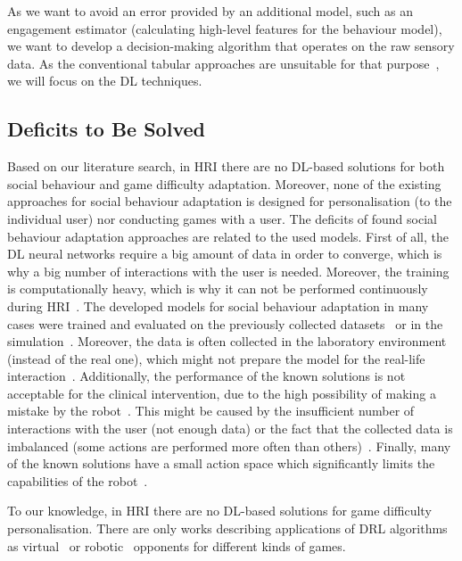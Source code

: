 \documentclass[thesis]{mas_proposal}
\begin{document}
As we want to avoid an error provided by an additional model, such as an engagement estimator (calculating high-level features for the behaviour model), we want to develop a decision-making algorithm that operates on the raw sensory data. As the conventional tabular approaches are unsuitable for that purpose~\cite{akalin2021reinforcement}, we will focus on the DL techniques.

\subsection{Deficits to Be Solved}
Based on our literature search, in HRI there are no DL-based solutions for both social behaviour and game difficulty adaptation. Moreover, none of the existing approaches for social behaviour adaptation is designed for personalisation (to the individual user) nor conducting games with a user. The deficits of found social behaviour adaptation approaches are related to the used models. First of all, the DL neural networks require a big amount of data in order to converge, which is why a big number of interactions with the user is needed. Moreover, the training is computationally heavy, which is why it can not be performed continuously during HRI~\cite{Qureshi2016,Qureshi2017,Qureshi2018,Romeo2019}. The developed models for social behaviour adaptation in many cases were trained and evaluated on the previously collected datasets~\cite{ClarkTurner2017,Romeo2018,Hijaz2021} or in the simulation~\cite{Turner2018,Belo2021,Belo2022}. Moreover, the data is often collected in the laboratory environment (instead of the real one), which might not prepare the model for the real-life interaction~\cite{ClarkTurner2017,Turner2018,Romeo2018}. Additionally, the performance of the known solutions is not acceptable for the clinical intervention, due to the high possibility of making a mistake by the robot~\cite{ClarkTurner2017,Turner2018,Romeo2019,Hijaz2021}. This might be caused by the insufficient number of interactions with the user (not enough data) or the fact that the collected data is imbalanced (some actions are performed more often than others)~\cite{Hijaz2021}. Finally, many of the known solutions have a small action space which significantly limits the capabilities of the robot~\cite{Qureshi2016,Qureshi2017,Qureshi2018,ClarkTurner2017,Turner2018,Belo2021,Belo2022,Romeo2018,Romeo2019}.

To our knowledge, in HRI there are no DL-based solutions for game difficulty personalisation. There are only works describing applications of DRL algorithms as virtual~\cite{mnih2015human,hausknecht2015deep,sorokin2015deep} or robotic~\cite{Cuayahuitl2017,Cuayahuitl2020} opponents for different kinds of games.
\end{document}
